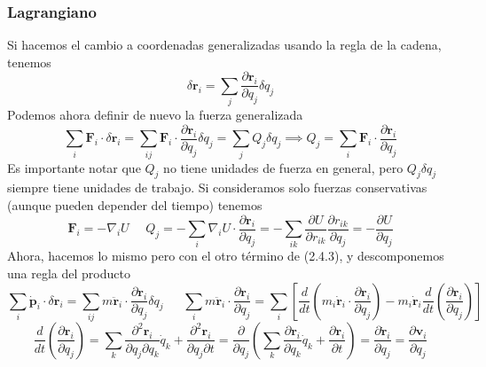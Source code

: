 \subsubsection{Lagrangiano}
Si hacemos el cambio a coordenadas generalizadas usando la regla de la cadena, tenemos
\begin{equation} \label{2.1.1}
    \delta \mathbf{r}_i = \sum_j \frac{\partial \mathbf{r}_i}{\partial q_j} \delta q_j
\end{equation} 
Podemos ahora definir de nuevo la fuerza generalizada
\begin{equation} \label{2.1.1}
    \sum_i \mathbf{F}_i \cdot \delta \mathbf{r}_i = \sum_{ij} \mathbf{F}_i \cdot \frac{\partial \mathbf{r}_i}{\partial q_j} \delta q_j = \sum_j Q_j \delta q_j \implies Q_j = \sum_i \mathbf{F}_i \cdot \frac{\partial \mathbf{r}_i}{\partial q_j}
\end{equation} 
Es importante notar que $Q_j$ no tiene unidades de fuerza en general, pero $Q_j \delta q_j$ siempre tiene unidades de trabajo. Si consideramos solo fuerzas conservativas (aunque pueden depender del tiempo) tenemos
\begin{equation} \label{2.1.1}
    \mathbf{F}_i = -\nabla_i U \ \ \ \ \ \ Q_j = -\sum_i \nabla_i U \cdot \frac{\partial \mathbf{r}_i}{\partial q_j} = - \sum_{ik} \frac{\partial U}{\partial r_{ik}} \frac{\partial r_{ik}}{\partial q_j} = - \frac{\partial U}{\partial q_j}
\end{equation} 
Ahora, hacemos lo mismo pero con el otro término de (2.4.3), y descomponemos una regla del producto
\begin{equation} \label{2.1.1}
    \sum_i \dot{\mathbf{p}}_i \cdot \delta \mathbf{r}_i = \sum_{ij} m \ddot{\mathbf{r}}_i \cdot \frac{\partial \mathbf{r}_i}{\partial q_j} \delta q_j \ \ \ \ \ \ \ \sum_{i} m \ddot{\mathbf{r}}_i \cdot \frac{\partial \mathbf{r}_i}{\partial q_j} = \sum_i \left[ \frac{d}{dt}\left(m_i \dot{\mathbf{r}}_i \cdot \frac{\partial \mathbf{r}_i}{\partial q_j}\right)- m_i \dot{\mathbf{r}}_i\frac{d}{dt}\left(\frac{\partial \mathbf{r}_i}{\partial q_j}\right)\right]
\end{equation} 
\begin{equation} \label{2.1.1}
    \frac{d}{dt}\left(\frac{\partial \mathbf{r}_i}{\partial q_j}\right) = \sum_k \frac{\partial^2 \mathbf{r}_i}{\partial q_j \partial q_k}\dot{q}_k + \frac{\partial^2 \mathbf{r}_i}{\partial q_j \partial t} = \frac{\partial}{\partial q_j}\left( \sum_k \frac{\partial \mathbf{r}_i}{ \partial q_k}\dot{q}_k + \frac{\partial\mathbf{r}_i}{\partial t} \right)= \frac{\partial \dot{\mathbf{r}}_i}{\partial q_j} = \frac{\partial \mathbf{v}_i}{\partial q_j}
\end{equation} 
